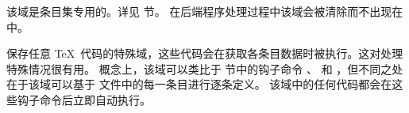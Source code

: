\begin{fieldlist}



该域是条目集专用的。详见  节。
在后端程序处理过程中该域会被清除而不出现在  中。



保存任意 \TeX\ 代码的特殊域，这些代码会在获取各条目数据时被执行。这对处理特殊情况很有用。
概念上，该域可以类比于  节中的钩子命令 、 和 ，但不同之处在于该域可以基于  文件中的每一条目进行逐条定义。
该域中的任何代码都会在这些钩子命令后立即自动执行。




\end{fieldlist}
